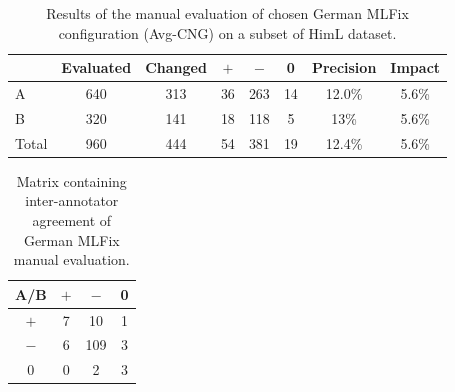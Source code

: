 \begin{table}[t]
\centering
\small

\begin{tabular}{l|cc|ccc|cc}
  &  Evaluated  &  Changed  &  $+$  &  $-$  &  0  &  Precision  &  Impact  \\
\hline
A  &  640  &  313  &  36  &  263  &  14  &  12.0\%  &  5.6\%  \\
B  &  320  &  141  &  18   &  118  &  5  &  13\%  &  5.6\%  \\ 
\hline
Total &  960  &  444  &  54  &  381  &  19  &  12.4\%  &  5.6\%  \\
\end{tabular}
\caption[German MLFix manual evaluation]{
Results of the manual evaluation of chosen German MLFix configuration (Avg-CNG)
on a subset of HimL dataset.
}
\label{maneval_de-final}
\end{table}

\begin{table}[t]
\centering
\small

\begin{tabular}{c|cc|c}
 A/B  &  $+$  &  $-$  &  0  \\
\hline
$+$  &  7  &  10  &  1  \\
$-$  &  6  &  109  &  3  \\
\hline
0 &  0  &  2  &  3  \\
\end{tabular}
\caption[German MLFix manual evaluation - inter-annotator agreement]{
    Matrix containing inter-annotator agreement of German MLFix manual evaluation.
}
\label{maneval_de-agree}
\end{table}
 
